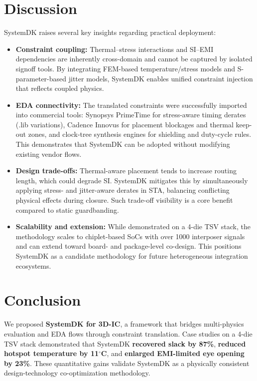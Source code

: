 \documentclass[conference]{IEEEtran}
\begin{document}
\section{Discussion}
SystemDK raises several key insights regarding practical deployment:

\begin{itemize}
  \item \textbf{Constraint coupling:}  
  Thermal–stress interactions and SI–EMI dependencies are inherently cross-domain
  and cannot be captured by isolated signoff tools.
  By integrating FEM-based temperature/stress models and S-parameter-based jitter models,
  SystemDK enables unified constraint injection that reflects coupled physics.

  \item \textbf{EDA connectivity:}  
  The translated constraints were successfully imported into commercial tools:
  Synopsys PrimeTime for stress-aware timing derates (.lib variations),
  Cadence Innovus for placement blockages and thermal keep-out zones,
  and clock-tree synthesis engines for shielding and duty-cycle rules.
  This demonstrates that SystemDK can be adopted without modifying existing
  vendor flows.

  \item \textbf{Design trade-offs:}  
  Thermal-aware placement tends to increase routing length, which could degrade SI.
  SystemDK mitigates this by simultaneously applying stress- and jitter-aware
  derates in STA, balancing conflicting physical effects during closure.
  Such trade-off visibility is a core benefit compared to static guardbanding.

  \item \textbf{Scalability and extension:}  
  While demonstrated on a 4-die TSV stack, the methodology scales to
  chiplet-based SoCs with over 1000 interposer signals and can extend toward
  board- and package-level co-design. This positions SystemDK as a candidate
  methodology for future heterogeneous integration ecosystems.
\end{itemize}

\section{Conclusion}
We proposed \textbf{SystemDK for 3D-IC}, a framework that bridges multi-physics
evaluation and EDA flows through constraint translation.
Case studies on a 4-die TSV stack demonstrated that SystemDK
\textbf{recovered slack by 87\%},
\textbf{reduced hotspot temperature by 11$^\circ$C},
and \textbf{enlarged EMI-limited eye opening by 23\%}.
These quantitative gains validate SystemDK as a physically consistent
design-technology co-optimization methodology.
\end{document}
